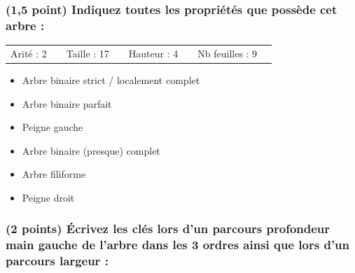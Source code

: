 \documentclass[11pt,a4paper]{article}
\begin{document}
\subsubsection{(1,5 point) Indiquez toutes les propriétés que possède cet arbre : }

\bigskip

\begin{tabular}{L{2cm}C{1.5cm} L{2cm}C{1.5cm} L{2cm}C{1.5cm} L{2.5cm}C{1.5cm}}
Arité : 2 & & Taille : 17 & & Hauteur : 4 & & Nb feuilles : 9 & \\
\end{tabular}

\medskip

\begin{table}[ht!]
  \centering
  \begin{minipage}{0.50\textwidth}
    \centering

\begin{itemize}
  \item[\checkmark] Arbre binaire strict / localement complet \phantom{()}
  \item[\CaseCoche] Arbre binaire parfait \phantom{()}
  \item[\CaseCoche] Peigne gauche \phantom{()}
\end{itemize}

  \end{minipage}
  \hfillx
  \begin{minipage}{0.50\textwidth}
    \centering

\begin{itemize}
  \item[\CaseCoche] Arbre binaire (presque) complet \phantom{()}
  \item[\CaseCoche] Arbre filiforme \phantom{()}
  \item[\CaseCoche] Peigne droit \phantom{()}
\end{itemize}

  \end{minipage}
\end{table}



\subsubsection{(2 points) \'Ecrivez les clés lors d'un parcours profondeur main gauche de l'arbre dans les 3 ordres ainsi que lors d'un parcours largeur : }
\end{document}
